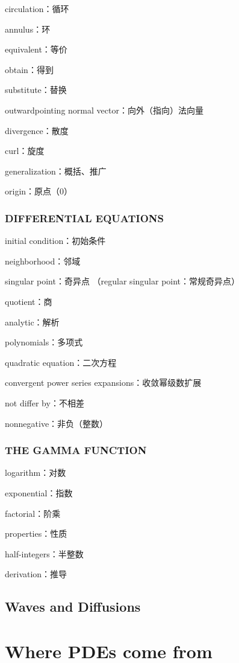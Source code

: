 \documentclass[hazy,blue,11pt]{elegantnote}
\begin{document}
    circulation：循环

    annulus：环

    equivalent：等价

    obtain：得到

    substitute：替换

    outwardpointing normal vector：向外（指向）法向量

    divergence：散度

    curl：旋度

    generalization：概括、推广

    origin：原点（0）

\subsubsection{DIFFERENTIAL EQUATIONS}

    initial condition：初始条件

    neighborhood：邻域

    singular point：奇异点
    （regular singular point：常规奇异点）

    quotient：商

    analytic：解析

    polynomials：多项式

    quadratic equation：二次方程

    convergent power series expansions：收敛幂级数扩展

    not differ by：不相差

    nonnegative：非负（整数）

\subsubsection{THE GAMMA FUNCTION}

    logarithm：对数

    exponential：指数

    factorial：阶乘

    properties：性质

    half-integers：半整数

    derivation：推导


\subsection{Waves and Diffusions}


\section{Where PDEs come from}
\end{document}
